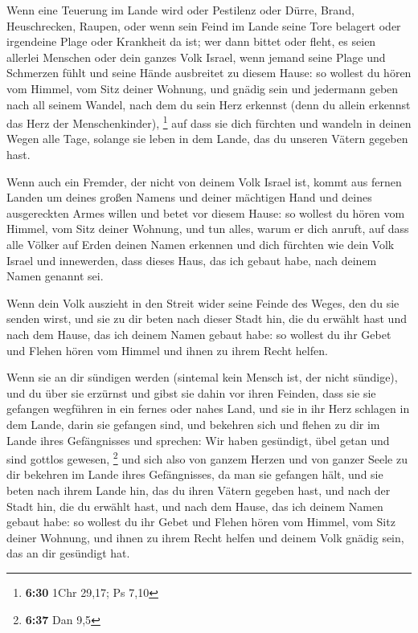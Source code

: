  Wenn eine Teuerung im Lande wird oder Pestilenz oder
Dürre, Brand, Heuschrecken, Raupen, oder wenn sein Feind im Lande seine
Tore belagert oder irgendeine Plage oder Krankheit da ist;
 wer dann bittet oder fleht, es seien allerlei Menschen
oder dein ganzes Volk Israel, wenn jemand seine Plage und Schmerzen
fühlt und seine Hände ausbreitet zu diesem Hause:  so
wollest du hören vom Himmel, vom Sitz deiner Wohnung, und gnädig sein
und jedermann geben nach all seinem Wandel, nach dem du sein Herz
erkennst (denn du allein erkennst das Herz der Menschenkinder),
\footnote{\textbf{6:30} 1Chr 29,17; Ps 7,10}  auf dass
sie dich fürchten und wandeln in deinen Wegen alle Tage, solange sie
leben in dem Lande, das du unseren Vätern gegeben hast.

 Wenn auch ein Fremder, der nicht von deinem Volk Israel
ist, kommt aus fernen Landen um deines großen Namens und deiner
mächtigen Hand und deines ausgereckten Armes willen und betet vor diesem
Hause:  so wollest du hören vom Himmel, vom Sitz deiner
Wohnung, und tun alles, warum er dich anruft, auf dass alle Völker auf
Erden deinen Namen erkennen und dich fürchten wie dein Volk Israel und
innewerden, dass dieses Haus, das ich gebaut habe, nach deinem Namen
genannt sei.

 Wenn dein Volk auszieht in den Streit wider seine Feinde
des Weges, den du sie senden wirst, und sie zu dir beten nach dieser
Stadt hin, die du erwählt hast und nach dem Hause, das ich deinem Namen
gebaut habe:  so wollest du ihr Gebet und Flehen hören
vom Himmel und ihnen zu ihrem Recht helfen.

 Wenn sie an dir sündigen werden (sintemal kein Mensch
ist, der nicht sündige), und du über sie erzürnst und gibst sie dahin
vor ihren Feinden, dass sie sie gefangen wegführen in ein fernes oder
nahes Land,  und sie in ihr Herz schlagen in dem Lande,
darin sie gefangen sind, und bekehren sich und flehen zu dir im Lande
ihres Gefängnisses und sprechen: Wir haben gesündigt, übel getan und
sind gottlos gewesen, \footnote{\textbf{6:37} Dan 9,5} 
und sich also von ganzem Herzen und von ganzer Seele zu dir bekehren im
Lande ihres Gefängnisses, da man sie gefangen hält, und sie beten nach
ihrem Lande hin, das du ihren Vätern gegeben hast, und nach der Stadt
hin, die du erwählt hast, und nach dem Hause, das ich deinem Namen
gebaut habe:  so wollest du ihr Gebet und Flehen hören
vom Himmel, vom Sitz deiner Wohnung, und ihnen zu ihrem Recht helfen und
deinem Volk gnädig sein, das an dir gesündigt hat.

